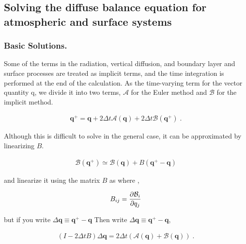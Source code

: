 \hypertarget{solving-the-diffuse-balance-equation-for-atmospheric-and-surface-systems}{%
\subsection{Solving the diffuse balance equation for atmospheric and
surface
systems}\label{solving-the-diffuse-balance-equation-for-atmospheric-and-surface-systems}}

\hypertarget{basic-solutions.}{%
\subsubsection{Basic Solutions.}\label{basic-solutions.}}

Some of the terms in the radiation, vertical diffusion, and boundary
layer and surface processes are treated as implicit terms, and the time
integration is performed at the end of the calculation. As the
time-varying term for the vector quantity {q}, we divide it into two
terms, \({\mathcal A}\) for the Euler method and \({\mathcal B}\) for
the implicit method.

\begin{eqnarray}
  {\mathbf q}^+
      = {\mathbf q} + 2 \Delta t {\mathcal A}( {\mathbf q}   )
                           + 2 \Delta t {\mathcal B}( {\mathbf q}^+ ) \; .
\end{eqnarray}

Although this is difficult to solve in the general case, it can be
approximated by linearizing \(B\).

\begin{eqnarray}
  {\mathcal B}( {\mathbf q}^+ )
                           \simeq {\mathcal B}( {\mathbf q} )
                            + B( {\mathbf q}^+ - {\mathbf q} )
\end{eqnarray}

and linearize it using the matrix \(B\) as where ,

\begin{eqnarray}
  B_{ij} = \frac{\partial{{\cal B}_i}}{\partial {q_j}}
\end{eqnarray}

but if you write
\(\Delta {\mathbf q} \equiv {\mathbf q}^+ - {\mathbf q}\) Then write
\(\Delta {\mathbf q} \equiv {\mathbf q}^+ - {\mathbf q}\),

\begin{eqnarray}
  ( I - 2 \Delta t B ) \Delta {\mathbf q}
      = 2 \Delta t \left(  {\mathcal A}( {\mathbf q} )
                         + {\mathcal B}( {\mathbf q} ) \right) \; .
\end{eqnarray}

